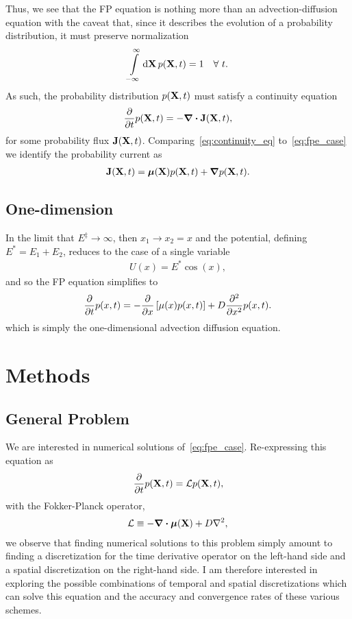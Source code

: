\documentclass[12pt]{article}
\begin{document}
Thus, we see that the FP equation is nothing more than an advection-diffusion equation with the caveat that, since it describes the evolution of a probability distribution, it must preserve normalization
\begin{align}
    \int\limits_{-\infty}^{\infty}\dd{\vb{X}}p(\vb{X},t) = 1\quad \forall\ t.
\end{align}
As such, the probability distribution $p(\vb{X},t)$ must satisfy a continuity equation 
\begin{align}
    \pdv{t}p(\vb{X},t) = -\div{\vb{J}(\vb{X},t)}, \label{eq:continuity_eq}
\end{align}
for some probability flux $\vb{J}(\vb{X},t)$. Comparing~\eqref{eq:continuity_eq} to~\eqref{eq:fpe_case} we identify the probability current as 
\begin{align}
    \vb{J}(\vb{X},t) = \bm{\mu}(\vb{X})p(\vb{X},t) + \grad{p(\vb{X},t)}.
\end{align}

\subsection{One-dimension}

In the limit that $E^{\ddagger} \to\infty$, then $x_{1}\to x_{2} = x$ and the potential, defining $E^{*} = E_{1} + E_{2}$, reduces to the case of a single variable
\begin{align}
U(x) = E^{*}\cos(x), 
\end{align} 
and so the FP equation simplifies to 
\begin{align}
    \pdv{t}p(x,t) = -\pdv{x}\left[\mu(x)p(x,t)\right] + D\pdv[2]{x}p(x,t).\label{eq:fpe_1D}
\end{align}
which is simply the one-dimensional advection diffusion equation.

\section{Methods}

\subsection{General Problem}

We are interested in numerical solutions of~\eqref{eq:fpe_case}. Re-expressing this equation as
\begin{align}
    \pdv{t}p(\vb{X},t) = \mathcal{L}p(\vb{X},t),\label{eq:fpe_operator}
\end{align}
with the Fokker-Planck operator,
\begin{align}
    \mathcal{L} \equiv -\div\bm{\mu}(\vb{X}) + D\laplacian,
\end{align}
we observe that finding numerical solutions to this problem simply amount to finding a discretization for the time derivative operator on the left-hand side and a spatial discretization on the right-hand side. I am therefore interested in exploring the possible combinations of temporal and spatial discretizations which can solve this equation and the accuracy and convergence rates of these various schemes. 
\end{document}
